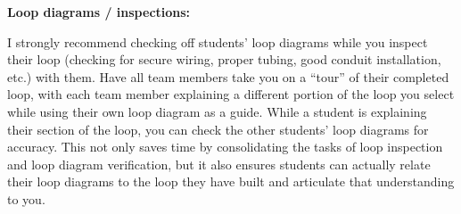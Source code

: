 \vskip 10pt














\noindent
{\bf Loop diagrams / inspections:}

I strongly recommend checking off students' loop diagrams while you inspect their loop (checking for secure wiring, proper tubing, good conduit installation, etc.) with them.  Have all team members take you on a ``tour'' of their completed loop, with each team member explaining a different portion of the loop you select while using their own loop diagram as a guide.  While a student is explaining their section of the loop, you can check the other students' loop diagrams for accuracy.  This not only saves time by consolidating the tasks of loop inspection and loop diagram verification, but it also ensures students can actually relate their loop diagrams to the loop they have built and articulate that understanding to you.




